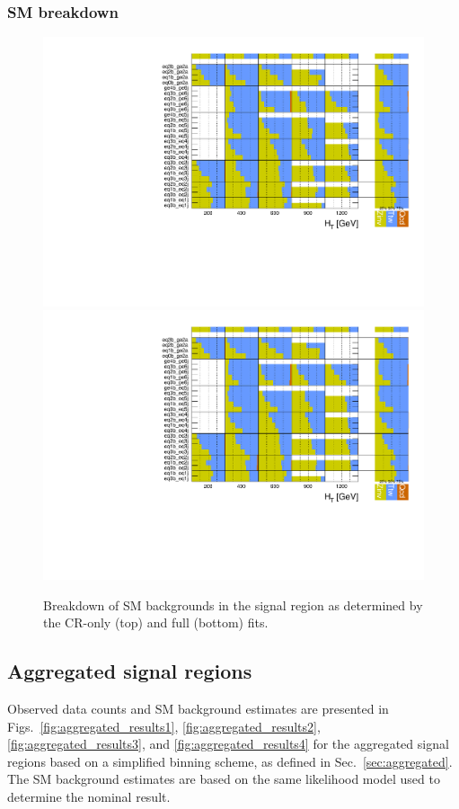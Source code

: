 \clearpage
\subsubsection{SM breakdown}

\begin{figure}[h!]
  \centering
  \caption{Breakdown of SM backgrounds in the signal region as
    determined by the CR-only (top) and full (bottom) fits.}
  \label{fig:breakdown}
  \includegraphics[width=0.8\linewidth]{figures/results/36invfb/breakdown/crfit/Signal_sample_composition.pdf}\\
  \includegraphics[width=0.8\linewidth]{figures/results/36invfb/breakdown/postfit/Signal_sample_composition.pdf}
\end{figure}

\clearpage
\subsection{Aggregated signal regions}
\label{sec:aggregated-results}

Observed data counts and SM background estimates are presented in
Figs.~\ref{fig:aggregated_results1}, \ref{fig:aggregated_results2},
\ref{fig:aggregated_results3}, and \ref{fig:aggregated_results4} for
the aggregated signal regions based on a simplified binning scheme, as
defined in Sec.~\ref{sec:aggregated}. The SM background estimates are
based on the same likelihood model used to determine the nominal
result.

